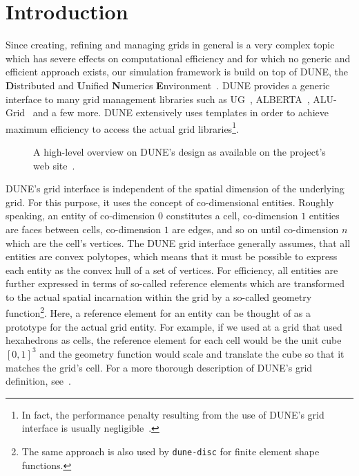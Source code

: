 \chapter{Introduction}

Since creating, refining and managing grids in general is a very
complex topic which has severe effects on computational efficiency and
for which no generic and efficient approach exists, our simulation
framework is build on top of DUNE, the \textbf{D}istributed and \textbf{U}nified
\textbf{N}umerics \textbf{E}nvironment~\cite{DUNE-HP}. DUNE provides a generic interface to many
grid management libraries such as UG~\cite{UG-HP}, ALBERTA~\cite{ALBERTA-HP},
ALU-Grid~\cite{ALUGRID-HP} and a few more. DUNE extensively uses templates in
order to achieve maximum efficiency to access the actual grid
libraries\footnote{In fact, the performance penalty resulting from the
  use of DUNE's grid interface is usually negligible~\cite{BURRI2006}.}.
\begin{figure}[hbt]
  \centering 
  \caption{
    \label{fig:dune-design}
    A high-level overview on DUNE's design as available on the project's
    web site~\cite{DUNE-HP}.
  }
\end{figure}

DUNE's grid interface is independent of the spatial dimension of the
underlying grid. For this purpose, it uses the concept of
co-dimensional entities. Roughly speaking, an entity of co-dimension
$0$ constitutes a cell, co-dimension $1$ entities are faces between
cells, co-dimension $1$ are edges, and so on until co-dimension $n$
which are the cell's vertices.  The DUNE grid interface generally
assumes, that all entities are convex polytopes, which means that it
must be possible to express each entity as the convex hull of a set of
vertices. For efficiency, all entities are further expressed in terms
of so-called reference elements which are transformed to the actual
spatial incarnation within the grid by a so-called geometry
function\footnote{The same approach is also used by \texttt{dune-disc} for
  finite element shape functions.}. Here, a reference element for an
entity can be thought of as a prototype for the actual grid
entity. For example, if we used at a grid that used hexahedrons as cells,
the reference element for each cell would be the unit cube $[0, 1]^3$
and the geometry function would scale and translate the cube so that
it matches the grid's cell. For a more thorough description of DUNE's
grid definition, see~\cite{BASTIAN2008}.

